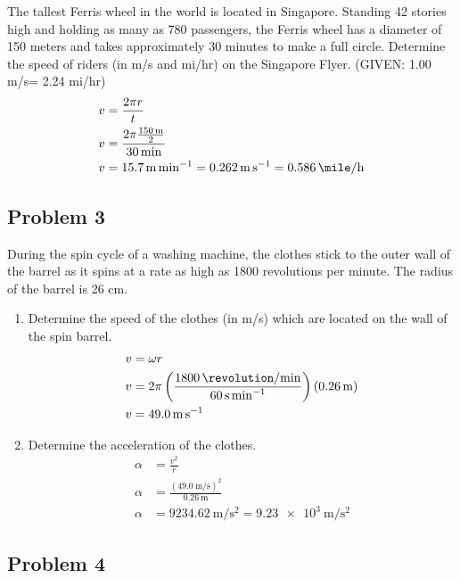 \documentclass{article}
\begin{document}
The tallest Ferris wheel in the world is located in Singapore. Standing 42 stories high and holding as many as 780 passengers, the Ferris wheel has a diameter of 150 meters and takes approximately 30 minutes to make a full circle. Determine the speed of riders (in m/s and mi/hr) on the Singapore Flyer. (GIVEN: 1.00 m/s= 2.24 mi/hr)
\begin{align*}
	v & = \frac{ 2\pi r }{ t } \\
	v & = \frac{ 2\pi \frac{ \SI{150}{\meter} }{ 2 } }{ \SI{30}{\minute} } \\
	v & = \SI{15.7}{\meter \per \minute} = \SI{0.262}{\meter \per \second} = \SI{0.586}{\mile \per \hour}
\end{align*}

\subsection{Problem 3}

During the spin cycle of a washing machine, the clothes stick to the outer wall of the barrel as it spins at a rate as high as 1800 revolutions per minute. The radius of the barrel is 26 cm.
\begin{enumerate}[label = \textbf{\alph*.}]
	\item Determine the speed of the clothes (in m/s) which are located on the wall of the spin barrel.
		\begin{align*}
			v & = \omega r \\
			v & = 2\pi \left( \frac{ \SI{1800}{\revolution \per \minute} }{ \SI{60}{\second \per \minute} } \right) (\SI{0.26}{\meter}) \\
			v & = \SI{49.0}{\meter \per \second}
		\end{align*}
	\item Determine the acceleration of the clothes.
		\begin{align*}
			\alpha & = \frac{ v^2 }{ r } \\
			\alpha & = \frac{ (\SI{49.0}{\meter \per \second})^2 }{ \SI{0.26}{\meter} } \\
			\alpha & = \SI{9234.62}{\meter \per \second \squared} = \SI{9.23e3}{\meter \per \second \squared}
		\end{align*}
\end{enumerate}

\subsection{Problem 4}
\end{document}
